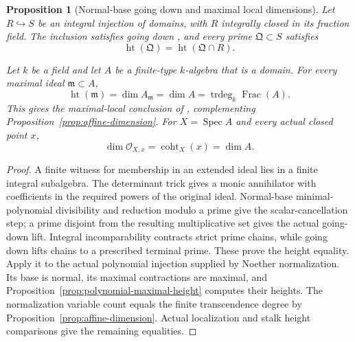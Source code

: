 \documentclass[11pt]{article}
\newtheorem{proposition}[theorem]{Proposition}
\theoremstyle{definition}
\theoremstyle{remark}
\DeclareMathOperator{\Spec}{Spec}
\begin{document}
\begin{proposition}[Normal-base going down and maximal local dimensions]
\label{prop:normalization-local-dimension}
Let \(R\hookrightarrow S\) be an integral injection of domains,
with \(R\) integrally closed in its fraction field.
The inclusion satisfies going down \cite{StacksNormalGoingDown},
and every prime \(\mathfrak Q\subset S\) satisfies
\[
  \operatorname{ht}(\mathfrak Q)
    =\operatorname{ht}(\mathfrak Q\cap R).
\]

Let \(k\) be a field and let \(A\) be a finite-type \(k\)-algebra
that is a domain. For every maximal ideal \(\mathfrak m\subset A\),
\[
  \operatorname{ht}(\mathfrak m)
    =\dim A_{\mathfrak m}
    =\dim A
    =\operatorname{trdeg}_k\operatorname{Frac}(A).
\]
This gives the maximal-local conclusion of
\cite{StacksAffineDimensionTranscendenceDegree}, complementing
Proposition~\ref{prop:affine-dimension}.
For \(X=\Spec A\) and every actual closed point \(x\),
\[
  \dim\mathcal O_{X,x}=\operatorname{coht}_X(x)=\dim A.
\]
\end{proposition}

\begin{proof}
A finite witness for membership in an extended ideal lies in a finite
integral subalgebra. The determinant trick gives a monic annihilator
with coefficients in the required powers of the original ideal.
Normal-base minimal-polynomial divisibility and reduction modulo a
prime give the scalar-cancellation step; a prime disjoint from the
resulting multiplicative set gives the actual going-down lift.
Integral incomparability contracts strict prime chains, while going
down lifts chains to a prescribed terminal prime. These prove the
height equality.
Apply it to the actual polynomial injection supplied by Noether
normalization. Its base is normal, its maximal contractions are
maximal, and Proposition~\ref{prop:polynomial-maximal-height} computes
their heights. The normalization variable count equals the finite
transcendence degree by Proposition~\ref{prop:affine-dimension}.
Actual localization and stalk height comparisons give the remaining
equalities.
\end{proof}
\end{document}
